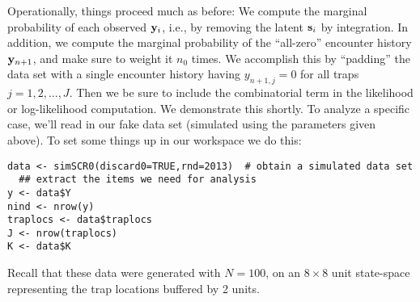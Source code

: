 Operationally, things proceed much as before: 
We compute the marginal probability of each observed ${\bf y}_{i}$,
i.e., by removing the latent ${\bf s}_{i}$ by integration. In
addition, we 
 compute the marginal probability of the ``all-zero'' encounter
history ${\bf y}_{n+1}$, and make sure to weight it $n_{0}$ times. We
accomplish this by ``padding'' the data set with a single encounter
history having $y_{n+1,j}=0$ for all traps $j=1,2,\ldots,J$. Then we
be sure to include the combinatorial term in the likelihood or
log-likelihood computation. We demonstrate this shortly.
To analyze a specific case, we'll read in our fake data set (simulated
using the parameters given above). To set some things up in our
workspace we do this:
\begin{verbatim}
data <- simSCR0(discard0=TRUE,rnd=2013)  # obtain a simulated data set
  ## extract the items we need for analysis
y <- data$Y
nind <- nrow(y)
traplocs <- data$traplocs
J <- nrow(traplocs)
K <- data$K
\end{verbatim}
Recall that these data were generated with $N=100$, on an $8 \times 8$ unit
state-space representing the trap locations  buffered by 2 units.

